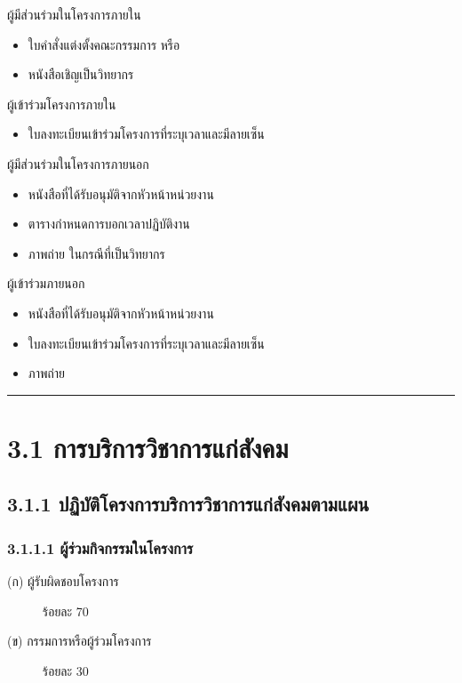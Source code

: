 \documentclass[a4paper,12pt,english]{sphinxmanual}
\begin{document}
ผู้มีส่วนร่วมในโครงการภายใน
\begin{itemize}
\item {} 
ใบคำสั่งแต่งตั้งคณะกรรมการ หรือ

\item {} 
หนังสือเชิญเป็นวิทยากร

\end{itemize}

ผู้เข้าร่วมโครงการภายใน
\begin{itemize}
\item {} 
ใบลงทะเบียนเข้าร่วมโครงการที่ระบุเวลาและมีลายเซ็น

\end{itemize}

ผู้มีส่วนร่วมในโครงการภายนอก
\begin{itemize}
\item {} 
หนังสือที่ได้รับอนุมัติจากหัวหน้าหน่วยงาน 

\item {} 
ตารางกำหนดการบอกเวลาปฏิบัติงาน

\item {} 
ภาพถ่าย ในกรณีที่เป็นวิทยากร

\end{itemize}

ผู้เข้าร่วมภายนอก
\begin{itemize}
\item {} 
หนังสือที่ได้รับอนุมัติจากหัวหน้าหน่วยงาน 

\item {} 
ใบลงทะเบียนเข้าร่วมโครงการที่ระบุเวลาและมีลายเซ็น

\item {} 
ภาพถ่าย

\end{itemize}


\bigskip\hrule\bigskip



\section{3.1 การบริการวิชาการแก่สังคม}
\label{\detokenize{3service:id5}}

\subsection{3.1.1 ปฏิบัติโครงการบริการวิชาการแก่สังคมตามแผน}
\label{\detokenize{3service:id6}}

\subsubsection{3.1.1.1 ผู้ร่วมกิจกรรมในโครงการ}
\label{\detokenize{3service:id7}}\begin{description}
\item[{(ก) ผู้รับผิดชอบโครงการ}] \leavevmode
ร้อยละ 70

\item[{(ข) กรรมการหรือผู้ร่วมโครงการ}] \leavevmode
ร้อยละ 30

\end{description}
\end{document}
